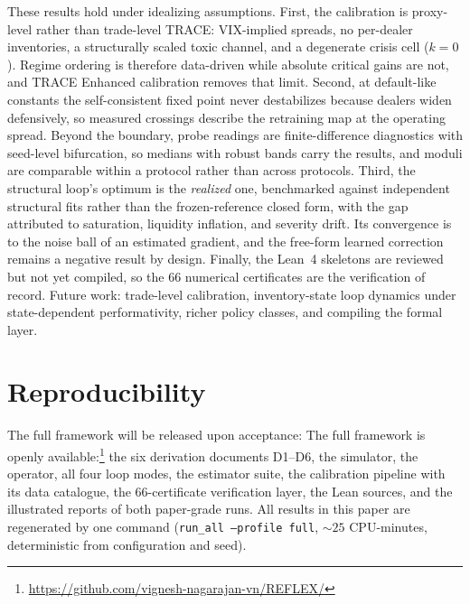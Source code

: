\documentclass[sigconf,anonymous,review]{acmart}
\newcommand{\code}[1]{\texttt{#1}}
\begin{document}
These results hold under idealizing assumptions. First, the calibration is
proxy-level rather than trade-level TRACE: VIX-implied
spreads, no per-dealer inventories, a structurally scaled toxic channel, and
a degenerate crisis cell ($k=0$). Regime ordering is therefore data-driven
while absolute critical gains are not, and TRACE Enhanced calibration removes
that limit. Second, at default-like constants the self-consistent fixed point
never destabilizes because dealers widen defensively, so measured crossings
describe the retraining map at the operating spread. Beyond the boundary,
probe readings are finite-difference diagnostics with seed-level bifurcation,
so medians with robust bands carry the results, and moduli are comparable
within a protocol rather than across protocols. Third, the structural loop's
optimum is the \emph{realized} one, benchmarked against independent
structural fits rather than the frozen-reference closed form, with the gap
attributed to saturation, liquidity inflation, and severity drift. Its
convergence is to the noise ball of an estimated gradient, and the free-form
learned correction remains a negative result by design. Finally, the Lean~4
skeletons are reviewed but not yet compiled, so the 66 numerical certificates
are the verification of record. Future work: trade-level calibration,
inventory-state loop dynamics under state-dependent performativity, richer
policy classes, and compiling the formal layer.

\section*{Reproducibility}
\label{sec:repro}
\ifdefined\ANON
The full framework will be released upon acceptance:
\else
The full framework is openly available:\footnote{%
\url{https://github.com/vignesh-nagarajan-vn/REFLEX/}}
\fi
the six derivation documents D1--D6, the simulator, the operator, all four
loop modes, the estimator suite, the calibration pipeline with its data
catalogue, the 66-certificate verification layer,
the Lean sources, and the illustrated reports of both paper-grade runs.
All results in this paper are regenerated by one command
(\code{run\_all --profile full}, ${\sim}25$ CPU-minutes, deterministic from
configuration and seed).
\end{document}
